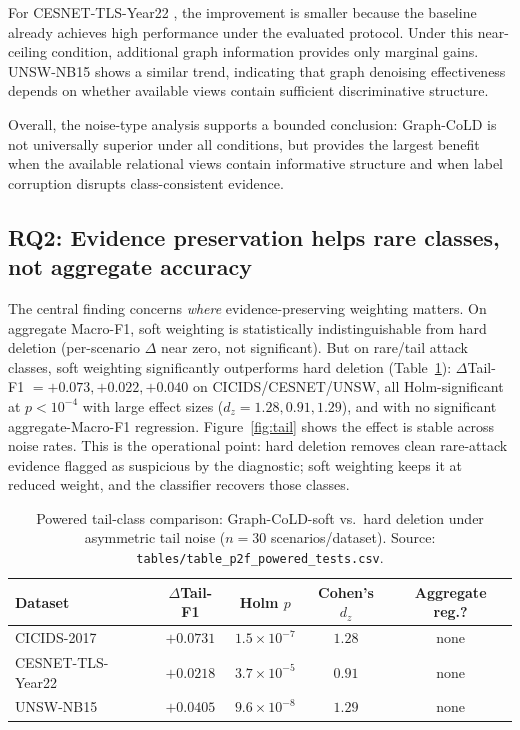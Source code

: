 \documentclass[preprint,3p,times]{elsarticle}
\begin{document}
For CESNET-TLS-Year22 \cite{hynek2024zenodo}, the improvement is smaller because
the baseline already achieves high performance under the evaluated protocol.
Under this near-ceiling condition, additional graph information provides only
marginal gains. UNSW-NB15 \cite{moustafa2016unsw} shows a similar trend,
indicating that graph denoising effectiveness depends on whether available views
contain sufficient discriminative structure.

Overall, the noise-type analysis supports a bounded conclusion: Graph-CoLD is
not universally superior under all conditions, but provides the largest benefit
when the available relational views contain informative structure and when
label corruption disrupts class-consistent evidence.

\subsection{RQ2: Evidence preservation helps rare classes, not aggregate accuracy}
\label{sec:res-tail}
The central finding concerns \emph{where} evidence-preserving weighting matters.
On aggregate Macro-F1, soft weighting is statistically indistinguishable from hard
deletion (per-scenario $\Delta$ near zero, not significant). But on rare/tail
attack classes, soft weighting significantly outperforms hard deletion
(Table~\ref{tab:tail}): $\Delta$Tail-F1 $=+0.073,+0.022,+0.040$ on
CICIDS/CESNET/UNSW, all Holm-significant at $p<10^{-4}$ with large effect sizes
($d_z=1.28,0.91,1.29$), and with no significant aggregate-Macro-F1 regression.
Figure~\ref{fig:tail} shows the effect is stable across noise rates. This is the
operational point: hard deletion removes clean rare-attack evidence flagged as
suspicious by the diagnostic; soft weighting keeps it at reduced weight, and the
classifier recovers those classes.

\begin{table}[t]
\centering
\caption{Powered tail-class comparison: Graph-CoLD-soft vs.\ hard deletion under
asymmetric tail noise ($n=30$ scenarios/dataset). Source:
\texttt{tables/table\_p2f\_powered\_tests.csv}.}
\label{tab:tail}
\small
\begin{tabular}{lcccc}
\toprule
Dataset & $\Delta$Tail-F1 & Holm $p$ & Cohen's $d_z$ & Aggregate reg.? \\
\midrule
CICIDS-2017 & $+0.0731$ & $1.5\times10^{-7}$ & $1.28$ & none \\
CESNET-TLS-Year22 & $+0.0218$ & $3.7\times10^{-5}$ & $0.91$ & none \\
UNSW-NB15 & $+0.0405$ & $9.6\times10^{-8}$ & $1.29$ & none \\
\bottomrule
\end{tabular}
\end{table}
\end{document}
